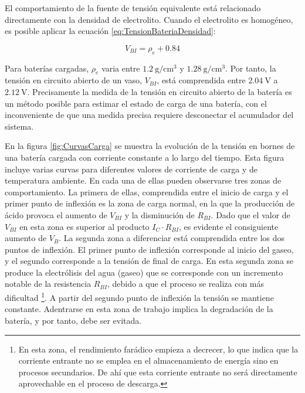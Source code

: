 El comportamiento de la fuente de tensión equivalente está relacionado
directamente con la densidad de electrolito. Cuando el electrolito
es homogéneo, es posible aplicar la ecuación \ref{eq:TensionBateriaDensidad}:

\begin{equation}
V_{BI}=\rho_{e}+0.84\label{eq:TensionBateriaDensidad}\end{equation}

Para baterías cargadas, $\rho_{e}$ varia entre $\SI{1.2}{\gram\per\cm\cubed}$
y $\SI{1.28}{\gram\per\cm\cubed}$. Por tanto, la tensión en circuito
abierto de un vaso, $V_{BI}$, está comprendida entre $\SI{2.04}{\volt}$
a $\SI{2.12}{\volt}$. Precisamente la medida de la tensión en circuito
abierto de la batería es un método posible para estimar el estado
de carga de una batería, con el inconveniente de que una medida precisa
requiere desconectar el acumulador del sistema.

En la figura \ref{fig:CurvasCarga} se muestra la evolución de la
tensión en bornes de una batería cargada con corriente constante a
lo largo del tiempo. Esta figura incluye varias curvas para diferentes
valores de corriente de carga y de temperatura ambiente. En cada una
de ellas pueden observarse tres zonas de comportamiento. La primera
de ellas, comprendida entre el inicio de carga y el primer punto de
inflexión es la zona de carga normal, en la que la producción de ácido
provoca el aumento de $V_{BI}$ y la disminución de $R_{BI}$. Dado
que el valor de $V_{BI}$ en esta zona es superior al producto $I_{C}\cdot R_{BI}$,
es evidente el consiguiente aumento de $V_{B}$. La segunda zona a
diferenciar está comprendida entre los dos puntos de inflexión. El
primer punto de inflexión corresponde al inicio del gaseo, y el segundo
corresponde a la tensión de final de carga. En esta segunda zona se
produce la electrólisis del agua (gaseo) que se corresponde con un
incremento notable de la resistencia $R_{BI}$, debido a que el proceso
se realiza con más dificultad%
\footnote{En esta zona, el rendimiento farádico empieza a decrecer, lo que indica
que la corriente entrante no se emplea en el almacenamiento de energía
sino en procesos secundarios. De ahí que esta corriente entrante no
será directamente aprovechable en el proceso de descarga.%
}. A partir del segundo punto de inflexión la tensión se mantiene constante.
Adentrarse en esta zona de trabajo implica la degradación de la batería,
y por tanto, debe ser evitada.

